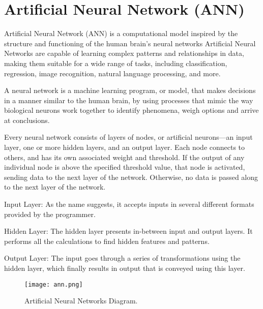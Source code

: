 \documentclass[12pt,a4paper]{report}
\begin{document}
\chapter{Artificial Neural Network (ANN)}
Artificial Neural Network (ANN) is a computational model inspired by the structure and functioning of the human brain's neural networks Artificial Neural Networks are capable of learning complex patterns and relationships in data, making them suitable for a wide range of tasks, including classification, regression, image recognition, natural language processing, and more. \par
A neural network is a machine learning program, or model, that makes decisions in a manner similar to the human brain, by using processes that mimic the way biological neurons work together to identify phenomena, weigh options and arrive at conclusions. \par
Every neural network consists of layers of nodes, or artificial neurons—an input layer, one or more hidden layers, and an output layer. Each node connects to others, and has its own associated weight and threshold. If the output of any individual node is above the specified threshold value, that node is activated, sending data to the next layer of the network. Otherwise, no data is passed along to the next layer of the network. \par
Input Layer:
As the name suggests, it accepts inputs in several different formats provided by the programmer.\par
Hidden Layer:
The hidden layer presents in-between input and output layers. It performs all the calculations to find hidden features and patterns.\par
Output Layer:
The input goes through a series of transformations using the hidden layer, which finally results in output that is conveyed using this layer.\par

\begin{figure}
  \centering
\texttt{[image: ann.png]}
  \caption{Artificial Neural Networks Diagram.}
\end{figure}
\end{document}
